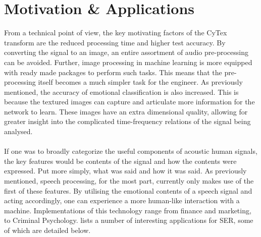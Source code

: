 \section{Motivation \& Applications}
From a technical point of view, the key motivating factors of the CyTex transform are the reduced processing time and higher test accuracy. By converting the signal to an image, an entire assortment of audio pre-processing can be avoided. Further, image processing in machine learning is more equipped with ready made packages to perform such tasks. This means that the pre-processing itself becomes a much simpler task for the engineer. As previously mentioned, the accuracy of emotional classification is also increased. This is because the textured images can capture and articulate more information for the network to learn. These images have an extra dimensional quality, allowing for greater insight into the complicated time-frequency relations of the signal being analysed.
\\ \\
If one was to broadly categorize the useful components of acoustic human signals, the key features would be contents of the signal and how the contents were expressed. Put more simply, what was said and how it was said. As previously mentioned, speech processing, for the most part, currently only makes use of the first of these features. By utilising the emotional contents of a speech signal and acting accordingly, one can experience a more human-like interaction with a machine. Implementations of this technology range from finance and marketing, to Criminal Psychology. \cite{Ramakrishnan12} lists a number of interesting applications for SER, some of which are detailed below.
